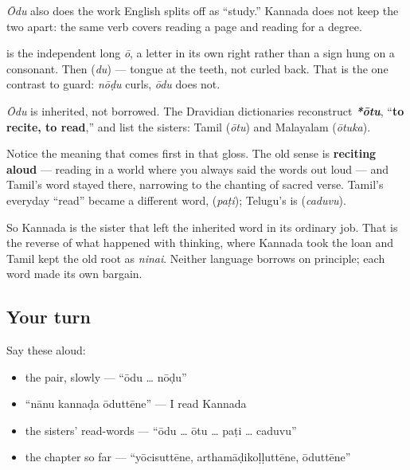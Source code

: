 \emph{Ōdu} also does the work English splits off as \textquotedblleft{}study.\textquotedblright{} Kannada does not keep the two apart: the same verb covers reading a page and reading for a degree.

\begin{sounds}
\textbf{} is the independent long \emph{ō}, a letter in its own right rather than a sign hung on a consonant. Then \textbf{} (\emph{du}) — tongue at the teeth, not curled back. That is the one contrast to guard: \emph{nōḍu} curls, \emph{ōdu} does not.
\end{sounds}

\begin{cousinweb}
\emph{Ōdu} is inherited, not borrowed. The Dravidian dictionaries reconstruct \emph{\textbf{*ōtu}}, \textquotedblleft{}\textbf{to recite, to read},\textquotedblright{} and list the sisters: Tamil \textbf{} (\emph{ōtu}) and Malayalam \textbf{} (\emph{ōtuka}).

Notice the meaning that comes first in that gloss. The old sense is \textbf{reciting aloud} — reading in a world where you always said the words out loud — and Tamil's word stayed there, narrowing to the chanting of sacred verse. Tamil's everyday \textquotedblleft{}read\textquotedblright{} became a different word, \textbf{} (\emph{paṭi}); Telugu's is \textbf{} (\emph{caduvu}).

So Kannada is the sister that left the inherited word in its ordinary job. That is the reverse of what happened with thinking, where Kannada took the loan and Tamil kept the old root as \emph{ninai}. Neither language borrows on principle; each word made its own bargain.
\end{cousinweb}

\subsection*{Your turn}
Say these aloud:

\begin{itemize}
\raggedright
  \item the pair, slowly — \textquotedblleft{}ōdu … nōḍu\textquotedblright{}
  \item \textquotedblleft{}nānu kannaḍa ōduttēne\textquotedblright{} — I read Kannada
  \item the sisters' read-words — \textquotedblleft{}ōdu … ōtu … paṭi … caduvu\textquotedblright{}
  \item the chapter so far — \textquotedblleft{}yōcisuttēne, arthamāḍikoḷḷuttēne, ōduttēne\textquotedblright{}
\end{itemize}


